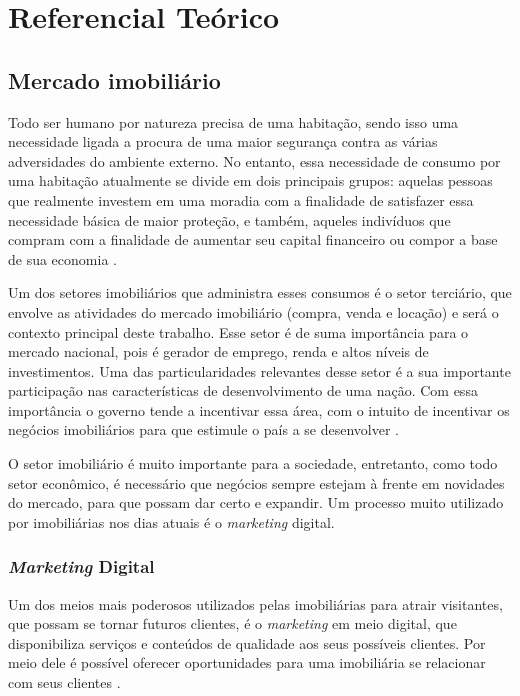 \chapter{Referencial Teórico}

\section{Mercado imobiliário}

Todo ser humano por natureza precisa de uma habitação, sendo isso uma necessidade ligada a procura de uma maior segurança contra as várias adversidades do ambiente externo. No entanto, essa necessidade de consumo por uma habitação atualmente se divide em dois principais grupos: aquelas pessoas que realmente investem em uma moradia com a finalidade de satisfazer essa necessidade básica de maior proteção, e também, aqueles indivíduos que compram com a finalidade de aumentar seu capital financeiro ou compor a base de sua economia \cite{Arraes:2008}.

Um dos setores imobiliários que administra esses consumos é o setor terciário, que envolve as atividades do mercado imobiliário (compra, venda e locação) e será o contexto principal deste trabalho. Esse setor é de suma importância para o mercado nacional, pois é gerador de emprego, renda e altos níveis de investimentos. Uma das particularidades relevantes desse setor é a sua importante participação nas características de desenvolvimento de uma nação. Com essa importância o governo tende a incentivar essa área, com o intuito de incentivar os negócios imobiliários para que estimule o país a se desenvolver \cite{Correa:2018}.

O setor imobiliário é muito importante para a sociedade, entretanto, como todo setor econômico, é necessário que negócios sempre estejam à frente em novidades do mercado, para que possam dar certo e expandir. Um processo muito utilizado por imobiliárias nos dias atuais é o \textit{marketing} digital.

\subsection{\textit{Marketing} Digital}

Um dos meios mais poderosos utilizados pelas imobiliárias para atrair visitantes, que possam se tornar futuros clientes, é o \textit{marketing} em meio digital, que disponibiliza serviços e conteúdos de qualidade aos seus possíveis clientes. Por meio dele é possível oferecer oportunidades para uma imobiliária se relacionar com seus clientes \cite{Barreto:2019}.

